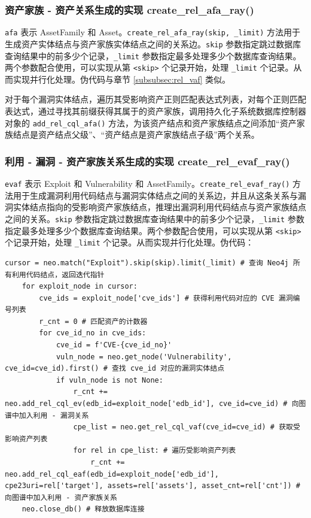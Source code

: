 \documentclass[a4paper,AutoFakeBold,oneside,12pt]{book}
\begin{document}
\subsubsection{资产家族 - 资产关系生成的实现 create{\_}rel{\_}afa{\_}ray()}

\lstinline|afa| 表示 AssetFamily 和 Asset。\lstinline|create_rel_afa_ray(skip, _limit)| 方法用于生成资产实体结点与资产家族实体结点之间的关系边。\lstinline|skip| 参数指定跳过数据库查询结果中的前多少个记录，\lstinline|_limit| 参数指定最多处理多少个数据库查询结果。两个参数配合使用，可以实现从第 \lstinline|<skip>| 个记录开始，处理 \lstinline|_limit| 个记录。从而实现并行化处理。伪代码与章节 \ref{subsubsec:rel_vaf}  类似。

对于每个漏洞实体结点，遍历其受影响资产正则匹配表达式列表，对每个正则匹配表达式，通过寻找其前缀获得其属于的资产家族，调用持久化子系统数据库控制器对象的 \lstinline|add_rel_cql_afa()| 方法，为该资产结点和资产家族结点之间添加“资产家族结点是资产结点父级”、“资产结点是资产家族结点子级”两个关系。

\subsubsection{利用 - 漏洞 - 资产家族关系生成的实现 create{\_}rel{\_}evaf{\_}ray()}

\lstinline|evaf| 表示 Exploit 和 Vulnerability 和 AssetFamily。\lstinline|create_rel_evaf_ray()| 方法用于生成漏洞利用代码结点与漏洞实体结点之间的关系边，并且从这条关系与漏洞实体结点指向的受影响资产家族结点，推理出漏洞利用代码结点与资产家族结点之间的关系。\lstinline|skip| 参数指定跳过数据库查询结果中的前多少个记录，\lstinline|_limit| 参数指定最多处理多少个数据库查询结果。两个参数配合使用，可以实现从第 \lstinline|<skip>| 个记录开始，处理 \lstinline|_limit| 个记录。从而实现并行化处理。伪代码：
\begin{lstlisting}[style=lgeneral]
	cursor = neo.match("Exploit").skip(skip).limit(_limit) # 查询 Neo4j 所有利用代码结点，返回迭代指针
	for exploit_node in cursor:
		cve_ids = exploit_node['cve_ids'] # 获得利用代码对应的 CVE 漏洞编号列表
		r_cnt = 0 # 匹配资产的计数器
		for cve_id_no in cve_ids:
			cve_id = f'CVE-{cve_id_no}'
			vuln_node = neo.get_node('Vulnerability', cve_id=cve_id).first() # 查找 cve_id 对应的漏洞实体结点
			if vuln_node is not None:
				r_cnt += neo.add_rel_cql_ev(edb_id=exploit_node['edb_id'], cve_id=cve_id) # 向图谱中加入利用 - 漏洞关系
				cpe_list = neo.get_rel_cql_vaf(cve_id=cve_id) # 获取受影响资产列表
				for rel in cpe_list: # 遍历受影响资产列表
					r_cnt += neo.add_rel_cql_eaf(edb_id=exploit_node['edb_id'], cpe23uri=rel['target'], assets=rel['assets'], asset_cnt=rel['cnt']) # 向图谱中加入利用 - 资产家族关系
	neo.close_db() # 释放数据库连接
\end{lstlisting}
\end{document}
